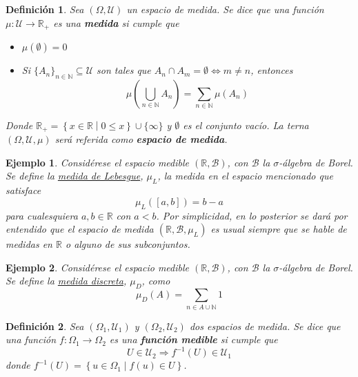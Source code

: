 \documentclass[12pt,letterpaper]{book}
\newtheorem{definicion}{Definición}[chapter]
\newtheorem{ejemplo}{Ejemplo}[chapter]
\newcommand{\R}{\mathbb{R}}
\newcommand{\N}{\mathbb{N}}
\newcommand{\talque}{\mathrel{}\middle|\mathrel{}}
\begin{document}
\begin{definicion}%
\label{medida}
Sea $(\Omega, \mathcal{U})$ un espacio de medida. Se dice que una función $\mu : \mathcal{U} \rightarrow \R_+$ es una \textbf{medida} si cumple que
\begin{itemize}
\item $\mu(\emptyset) = 0$
\item Si $\{ A_n \}_{n\in \mathbb{N}} \subseteq \mathcal{U}$ son tales que $A_n \cap A_m = \emptyset \Leftrightarrow m\neq n$, entonces 
\begin{equation}
\mu\left( \bigcup_{n\in \mathbb{N}} A_n \right) = \sum_{n\in \mathbb{N}} \mu(A_n)
\end{equation}
\end{itemize}
Donde $\R_+ = \left\{ x\in \R \talque 0 \leq x \right\} \cup \{ \infty \}$ y $\emptyset$ es el conjunto vacío. La terna $(\Omega,\mathcal{U},\mu)$ será referida como \textbf{espacio de medida}.
\end{definicion}

\begin{ejemplo}
Considérese el espacio medible $(\R, \mathcal{B})$, con $\mathcal{B}$ la $\sigma$-álgebra de Borel. Se define la \ul{medida de Lebesgue}, $\mu_L$, la medida en el espacio mencionado que satisface 
\begin{equation}
\mu_L\left(\left[a,b\right]\right) = b-a
\end{equation}
para cualesquiera $a,b \in \R$ con $a<b$. Por simplicidad, en lo posterior se dará por entendido que el espacio de medida $(\R, \mathcal{B},\mu_L)$ es \textit{usual} siempre que se hable de medidas en $\R$ o alguno de sus subconjuntos.
\end{ejemplo}

\begin{ejemplo}
Considérese el espacio medible $(\R, \mathcal{B})$, con $\mathcal{B}$ la $\sigma$-álgebra de Borel. Se define la \ul{medida discreta}, $\mu_D$, como
\begin{equation}
\mu_D(A) = \sum_{n \in A \cup \N} 1
\end{equation}
\end{ejemplo}

\begin{definicion}
Sea $(\Omega_1, \mathcal{U}_1)$ y $(\Omega_2, \mathcal{U}_2)$ dos espacios de medida. Se dice que una función $f:\Omega_1\rightarrow\Omega_2$ es una \textbf{función medible} si cumple que
\begin{equation}
U \in \mathcal{U}_2 \Rightarrow f^{-1}(U) \in \mathcal{U}_1 
\end{equation}
donde $f^{-1}(U) = \left\{ u\in \Omega_1 \talque f(u) \in U \right\}$.
\end{definicion}
\end{document}
